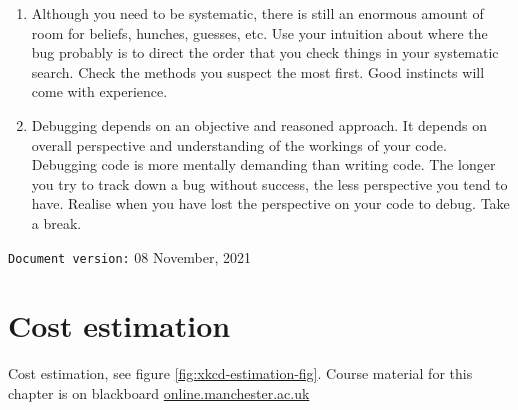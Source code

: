 \documentclass[
]{book}
\begin{document}
\begin{enumerate}
\item
  Although you need to be systematic, there is still an enormous amount of room for beliefs, hunches, guesses, etc. Use your intuition about where the bug probably is to direct the order that you check things in your systematic search. Check the methods you suspect the most first. Good instincts will come with experience.
\item
  Debugging depends on an objective and reasoned approach. It depends on overall perspective and understanding of the workings of your code. Debugging code is more mentally demanding than writing code. The longer you try to track down a bug without success, the less perspective you tend to have. Realise when you have lost the perspective on your code to debug. Take a break.
\end{enumerate}

\texttt{Document\ version:} 08 November, 2021

\hypertarget{estimating}{%
\chapter{Cost estimation}\label{estimating}}

Cost estimation, see figure \ref{fig:xkcd-estimation-fig}. Course material for this chapter is on blackboard \href{https://online.manchester.ac.uk}{online.manchester.ac.uk}
\end{document}
